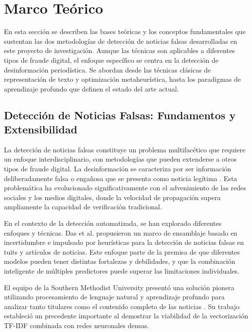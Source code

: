 \chapter{Marco Teórico \label{cap:MarcoTeorico}}

En esta sección se describen las bases teóricas y los conceptos fundamentales que sustentan las dos metodologías de detección de noticias falsas desarrolladas en este proyecto de investigación. Aunque las técnicas son aplicables a diferentes tipos de fraude digital, el enfoque específico se centra en la detección de desinformación periodística. Se abordan desde las técnicas clásicas de representación de texto y optimización metaheurística, hasta los paradigmas de aprendizaje profundo que definen el estado del arte actual.

\section{Detección de Noticias Falsas: Fundamentos y Extensibilidad}
\label{sec:deteccion_noticias_falsas}

La detección de noticias falsas constituye un problema multifacético que requiere un enfoque interdisciplinario, con metodologías que pueden extenderse a otros tipos de fraude digital. La desinformación se caracteriza por ser información deliberadamente falsa o engañosa que se presenta como noticia legítima \cite{bondielli2019survey}. Esta problemática ha evolucionado significativamente con el advenimiento de las redes sociales y los medios digitales, donde la velocidad de propagación supera ampliamente la capacidad de verificación tradicional.

En el contexto de la detección automatizada, se han explorado diferentes enfoques y técnicas. Das et al. \cite{das2022heuristic} propusieron un marco de ensamblaje basado en incertidumbre e impulsado por heurísticas para la detección de noticias falsas en tuits y artículos de noticias. Este enfoque parte de la premisa de que diferentes modelos pueden tener distintas fortalezas y debilidades, y que la combinación inteligente de múltiples predictores puede superar las limitaciones individuales.

El equipo de la Southern Methodist University presentó una solución pionera utilizando procesamiento de lenguaje natural y aprendizaje profundo para analizar tanto titulares como el contenido completo de las noticias \cite{thota2018fake}. Su trabajo estableció un precedente importante al demostrar la viabilidad de la vectorización TF-IDF combinada con redes neuronales densas.

